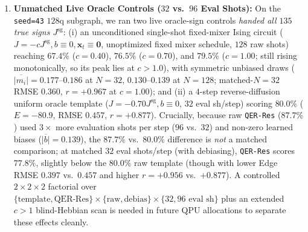 \documentclass[11pt]{article}
\begin{document}
\begin{enumerate}[leftmargin=1.4em,itemsep=2pt,topsep=2pt]
  \item \textbf{Unmatched Live Oracle Controls ($32$ vs.\ $96$ Eval Shots):} On the \texttt{seed=43} $128$q subgraph, we ran two live oracle-sign controls \emph{handed all $135$ true signs $J^{\text{sg}}$}: (i) an unconditioned single-shot fixed-mixer Ising circuit ($J{=}{-}cJ^{\text{sg}}, b{\equiv}0, \mathbf{x}_t{\equiv}\mathbf{0}$, unoptimized fixed mixer schedule, $128$ raw shots) reaching $67.4\%$ ($c{=}0.40$), $76.5\%$ ($c{=}0.70$), and $79.5\%$ ($c{=}1.00$; still rising monotonically, so its peak lies at $c{>}1.0$), with symmetric unbiased draws ($\overline{|m_i|}{=}0.177$--$0.186$ at $N{=}32$, $0.130$--$0.139$ at $N{=}128$; matched-$N{=}32$ RMSE $0.360$, $r{=}+0.967$ at $c{=}1.00$); and (ii) a $4$-step reverse-diffusion uniform oracle template ($J{=}{-}0.70J^{\text{sg}}, b{\equiv}0$, $32$ eval sh/step) scoring $80.0\%$ ($E{=}-80.9$, RMSE $0.457$, $r{=}+0.877$). Crucially, because raw \texttt{QER-Res} ($87.7\%$) used $3\times$ more evaluation shots per step ($96$ vs.\ $32$) and non-zero learned biases ($\overline{|b|}{=}0.139$), the $87.7\%$ vs.\ $80.0\%$ difference is \emph{not} a matched comparison; at matched $32$ eval shots/step (with debiasing), \texttt{QER-Res} scores $77.8\%$, slightly below the $80.0\%$ raw template (though with lower Edge RMSE $0.397$ vs.\ $0.457$ and higher $r{=}+0.956$ vs.\ $+0.877$). A controlled $2{\times}2{\times}2$ factorial over $\{\text{template}, \text{QER-Res}\}\times\{\text{raw}, \text{debias}\}\times\{32, 96\text{ eval sh}\}$ plus an extended $c{>}1$ blind-Hebbian scan is needed in future QPU allocations to separate these effects cleanly.

\end{enumerate}
\end{document}
